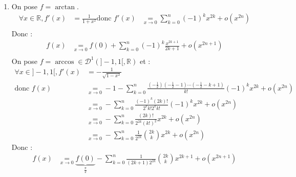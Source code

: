 \documentclass[../main.tex]{subfiles}
\begin{document}
\begin{enumerate}
    \item On pose $f = \arctan$. 
    \begin{align*}
        \forall x \in \mathbb{R}, f'(x) &= \frac{1}{1 + x^2}
        \text{donc } f'(x) &\underset{x\to 0}{=} \sum_{k=0}^{n} (-1)^k x^{2k} + o(x^{2n}) \\
    \end{align*}
    Donc : 
    \begin{align*}
        f(x) &\underset{x\to 0}{=} f(0) + \sum_{k=0}^{n} (-1)^k \frac{x^{2k+1}}{2k+1} + o(x^{2n+1}) \\
    \end{align*}
    On pose $f = \arccos \in \mathcal{D}^1(]-1, 1[, \mathbb{R})$ et : 
    \begin{align*}
        \forall x\in ]-1, 1[, f'(x) &= -\frac{1}{\sqrt{1 - x^2}} \\
        \text{donc } f(x) &\underset{x\to 0}{=} -1 - \sum_{k=0}^{n} \frac{\left( -\frac{1}{2} \right) \left( -\frac{1}{2} - 1 \right) \cdots \left( -\frac{1}{2} - k+1 \right)}{k!} (-1)^k x^{2k} + o(x^{2n}) \\
        &\underset{x\to 0}{=} -\sum_{k=0}^{n} \frac{(-1)^k (2k)!}{2^{k} k! 2^k k!} (-1)^k x^{2k} + o(x^{2n}) \\
        &\underset{x\to 0}{=} -\sum_{k=0}^{n} \frac{(2k)!}{2^{2k} (k!)^2} x^{2k} + o(x^{2n}) \\
        &\underset{x\to 0}{=} -\sum_{k=0}^{n} \frac{1}{2^{2k}} \binom{2k}{k} x^{2k} + o(x^{2n})
    \end{align*}
    Donc : 
    \begin{align*}
        f(x) &\underset{x\to 0}{=} \underbrace{f(0)}_{\frac{\pi}{2}} - \sum_{k=0}^{n} \frac{1}{(2k+1) 2^{2k}} \binom{2k}{k} x^{2k+1} + o(x^{2n+1})
    \end{align*}
\end{enumerate}
\end{document}
